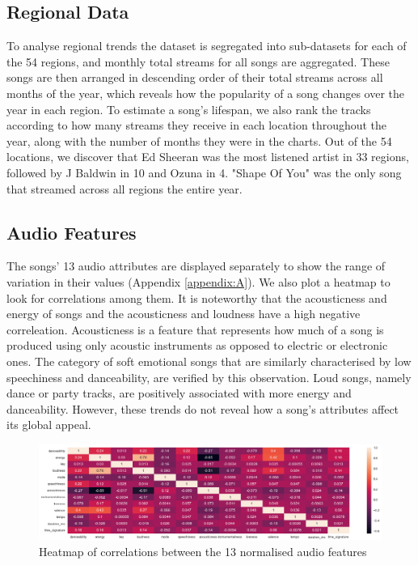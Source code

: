 \subsection{Regional Data}
To analyse regional trends the dataset is segregated into sub-datasets for each of the 54 regions, and monthly total streams for all songs are aggregated. These songs are then arranged in descending order of their total streams across all months of the year, which reveals how the popularity of a song changes over the year in each region. To estimate a song's lifespan, we also rank the tracks according to how many streams they receive in each location throughout the year, along with the number of months they were in the charts. Out of the 54 locations, we discover that Ed Sheeran was the most listened artist in 33 regions, followed by J Baldwin in 10 and Ozuna in 4. "Shape Of You" was the only song that streamed across all regions the entire year.

\subsection{Audio Features}
The songs' 13 audio attributes are displayed separately to show the range of variation in their values (Appendix \ref{appendix:A}). We also plot a heatmap to look for correlations among them. It is noteworthy that the acousticness and energy of songs and the acousticness and loudness have a high negative correleation. Acousticness is a feature that represents how much of a song is produced using only acoustic instruments as opposed to electric or electronic ones. The category of soft emotional songs that are similarly characterised by low speechiness and danceability, are verified by this observation. Loud songs, namely dance or party tracks, are positively associated with more energy and danceability. However, these trends do not reveal how a song's attributes affect its global appeal.
\begin{figure}[h]
\centering
\centerline{\includegraphics[width=\textwidth]{Outputs/Correlation Heatmap - Normalised Audio Features.png}}
\caption{Heatmap of correlations between the 13 normalised audio features}
\end{figure}

